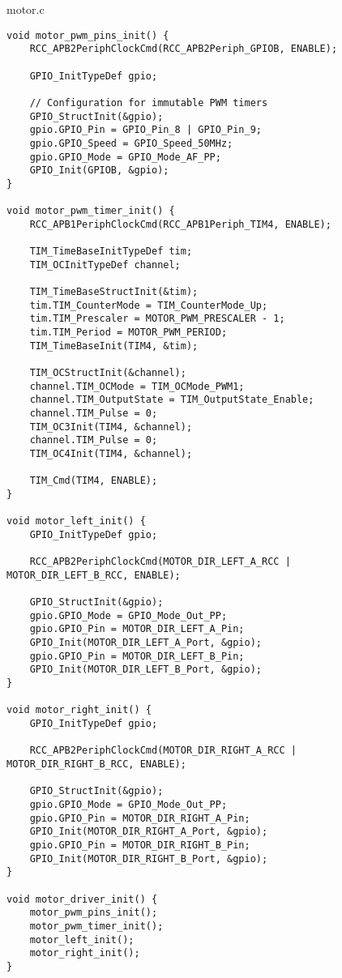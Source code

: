 \documentclass[a4paper,12pt,twoside,openany]{report}
\begin{document}
motor.c
\begin{lstlisting}[style=customc]
void motor_pwm_pins_init() {
	RCC_APB2PeriphClockCmd(RCC_APB2Periph_GPIOB, ENABLE);

	GPIO_InitTypeDef gpio;
	
	// Configuration for immutable PWM timers
	GPIO_StructInit(&gpio);
	gpio.GPIO_Pin = GPIO_Pin_8 | GPIO_Pin_9;
	gpio.GPIO_Speed = GPIO_Speed_50MHz;
	gpio.GPIO_Mode = GPIO_Mode_AF_PP;
	GPIO_Init(GPIOB, &gpio);
}

void motor_pwm_timer_init() {
	RCC_APB1PeriphClockCmd(RCC_APB1Periph_TIM4, ENABLE);

	TIM_TimeBaseInitTypeDef tim;
	TIM_OCInitTypeDef channel;

	TIM_TimeBaseStructInit(&tim);
	tim.TIM_CounterMode = TIM_CounterMode_Up;
	tim.TIM_Prescaler = MOTOR_PWM_PRESCALER - 1;
	tim.TIM_Period = MOTOR_PWM_PERIOD;
	TIM_TimeBaseInit(TIM4, &tim);
	
	TIM_OCStructInit(&channel);
	channel.TIM_OCMode = TIM_OCMode_PWM1;
	channel.TIM_OutputState = TIM_OutputState_Enable;
	channel.TIM_Pulse = 0;
	TIM_OC3Init(TIM4, &channel);
	channel.TIM_Pulse = 0;
	TIM_OC4Init(TIM4, &channel);

	TIM_Cmd(TIM4, ENABLE);
}

void motor_left_init() {
	GPIO_InitTypeDef gpio;
	
	RCC_APB2PeriphClockCmd(MOTOR_DIR_LEFT_A_RCC | MOTOR_DIR_LEFT_B_RCC, ENABLE);
	
	GPIO_StructInit(&gpio);
	gpio.GPIO_Mode = GPIO_Mode_Out_PP;
	gpio.GPIO_Pin = MOTOR_DIR_LEFT_A_Pin;
	GPIO_Init(MOTOR_DIR_LEFT_A_Port, &gpio);
	gpio.GPIO_Pin = MOTOR_DIR_LEFT_B_Pin;
	GPIO_Init(MOTOR_DIR_LEFT_B_Port, &gpio);
}

void motor_right_init() {
	GPIO_InitTypeDef gpio;
	
	RCC_APB2PeriphClockCmd(MOTOR_DIR_RIGHT_A_RCC | MOTOR_DIR_RIGHT_B_RCC, ENABLE);
	
	GPIO_StructInit(&gpio);
	gpio.GPIO_Mode = GPIO_Mode_Out_PP;
	gpio.GPIO_Pin = MOTOR_DIR_RIGHT_A_Pin;
	GPIO_Init(MOTOR_DIR_RIGHT_A_Port, &gpio);
	gpio.GPIO_Pin = MOTOR_DIR_RIGHT_B_Pin;
	GPIO_Init(MOTOR_DIR_RIGHT_B_Port, &gpio);
}

void motor_driver_init() {
	motor_pwm_pins_init();
	motor_pwm_timer_init();
	motor_left_init();
	motor_right_init();
}
\end{lstlisting}
\end{document}
